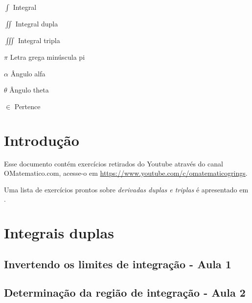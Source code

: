 \documentclass[
	12pt,				%
	openright,			%
	twoside,			%
	a4paper,			%
	english,			%
	french,				%
	spanish,			%
	brazil,				%
]{abntex2}
\begin{document}
\begin{simbolos}
	\item[$\displaystyle\int$] Integral
	\item[$\displaystyle\iint$] Integral dupla
	\item[$\displaystyle\iiint$] Integral tripla
	\item[$\pi$] Letra grega minúscula pi
	\item[$\alpha$] Ângulo alfa
	\item[$\theta$] Ângulo theta
	\item[$\in$] Pertence
\end{simbolos}

\tableofcontents*
\cleardoublepage


\textual

\chapter*[Introdução]{Introdução}

Esse documento contém exercícios retirados do Youtube através do canal OMatematico.com, acesse-o em \url{https://www.youtube.com/c/omatematicogrings}. 

Uma lista de exercícios prontos sobre \emph{derivadas duplas e triplas} é apresentado em .


\chapter{Integrais duplas}\label{integrais_duplas}
	\section{Invertendo os limites de integração - Aula 1}			
				
	\section{Determinação da região de integração - Aula 2}		
				
\end{document}
